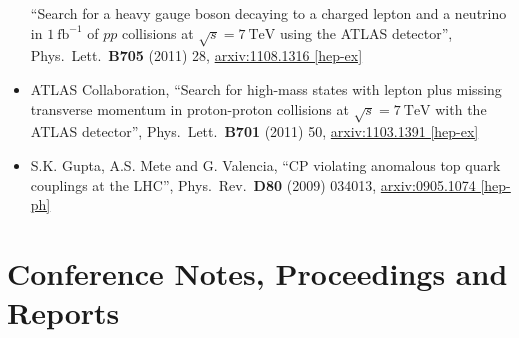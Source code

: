 \documentclass[a4paper,10pt]{article}
\begin{document}
\begin{itemize}
	``Search for a heavy gauge boson decaying to a charged lepton and a neutrino in $1\ \mathrm{fb}^{-1}$ of $pp$ collisions at $\sqrt{s} = 7\ \mathrm{TeV}$ using the ATLAS detector'', 
	Phys.\ Lett.\ {\bf B705} (2011) 28, 
	\href{http://arxiv.org/abs/arXiv:1108.1316}{arxiv:1108.1316 [hep-ex]}
	\item ATLAS Collaboration,
	``Search for high-mass states with lepton plus missing transverse momentum in proton-proton collisions at $\sqrt{s} = 7\ \mathrm{TeV}$ with the ATLAS detector'', 
	Phys.\ Lett.\ {\bf B701} (2011) 50, 
	\href{http://arxiv.org/abs/1103.1391}{arxiv:1103.1391 [hep-ex]}
	\item S.K. Gupta, A.S. Mete and G. Valencia,
	``CP violating anomalous top quark couplings at the LHC'',  
	Phys.\ Rev.\ {\bf D80} (2009) 034013, 
	\href{http://arxiv.org/abs/0905.1074}{arxiv:0905.1074 [hep-ph]}
\end{itemize}

\section{Conference Notes, Proceedings and Reports}
\end{document}
